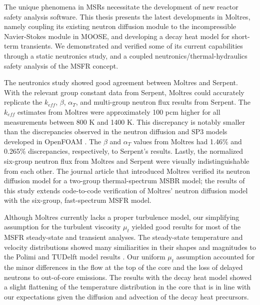 The unique phenomena in \glspl{MSR}
necessitate the development of new reactor safety analysis software.
This thesis presents the latest developments in Moltres, namely coupling its
existing neutron diffusion module to the incompressible Navier-Stokes module
in MOOSE, and developing a decay heat model for short-term transients. We
demonstrated and verified some of its current capabilities through a static
neutronics study, and a coupled neutronics/thermal-hydraulics safety analysis
of the \gls{MSFR} concept.

The neutronics study showed good agreement between Moltres and Serpent. With
the relevant group constant data from Serpent,
Moltres could accurately replicate the $k_{eff}$, $\beta$,
$\alpha_T$, and multi-group neutron flux results from Serpent. The
$k_{eff}$ estimates from Moltres were approximately 100 pcm higher for all
measurements between 800 K and 1400 K. This discrepancy is notably smaller
than the discrepancies observed in the neutron diffusion and SP3 models
developed in OpenFOAM \cite{aufiero_extended_2013}. The $\beta$ and $\alpha_T$
values from Moltres had 1.46\% and 0.265\% discrepancies, respectively, to
Serpent's results. Lastly, the normalized six-group neutron flux from Moltres
and Serpent were visually indistinguishable from each other. The journal
article that introduced Moltres \cite{lindsay_introduction_2018} verified its
neutron diffusion model for a two-group thermal-spectrum \gls{MSBR} model;
the results of this study extends code-to-code verification of Moltres'
neutron diffusion model with the six-group, fast-spectrum \gls{MSFR} model.

Although Moltres currently lacks a proper turbulence model, our simplifying
assumption for the turbulent viscosity $\mu_t$ yielded good results for most
of the \gls{MSFR}
steady-state and transient analyses. The steady-state temperature and velocity
distributions showed many similiarities in their shapes and magnitudes to the
Polimi and TUDelft model results \cite{fiorina_modelling_2014}. Our
uniform $\mu_t$ assumption accounted for the minor differences in the flow at
the top of the core and the loss of delayed neutrons to out-of-core emissions.
The results with the decay heat model showed a slight flattening of the
temperature distribution in the core that is in line with our expectations
given the diffusion and advection of the decay heat precursors.

